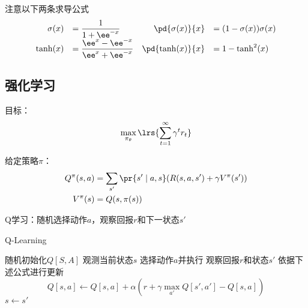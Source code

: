 注意以下两条求导公式
\[\begin{array}{rlrl}
\sigma(x)&=\dfrac{1}{1+\ee^{-x}} & \pd{\sigma(x)}{x}&=(1-\sigma(x))\sigma(x)\\
\tanh(x)&=\dfrac{\ee^x-\ee^{-x}}{\ee^x+\ee^{-x}} & \pd{\tanh(x)}{x}&=1-\tanh^2(x)
\end{array}\]

\subsection{强化学习}
目标：
\[\max_{\pi_\theta}\lrs{\sum_{t=1}^\infty\gamma^tr_t}\]

给定策略$\pi$：
\[\begin{aligned}
Q^\pi(s,a) &= \sum_{s'}\pr{s'\mid a,s}(R(s,a,s')+\gamma V^\pi(s'))\\
V^\pi(s) &= Q(s,\pi(s))
\end{aligned}\]

Q学习：随机选择动作$a$，观察回报$r$和下一状态$s'$
\begin{algorithm}
\caption{Q-Learning}
\begin{algorithmic}[1]
\State 随机初始化$Q[S,A]$
\State 观测当前状态$s$
\Repeat
\State 选择动作$a$并执行
\State 观察回报$r$和状态$s'$
\State 依据下述公式进行更新
\[Q[s,a]\gets Q[s,a]+\alpha(r+\gamma\max_{a'}Q[s',a']-Q[s,a])\]
\State $s\gets s'$
\end{algorithmic}
\end{algorithm}